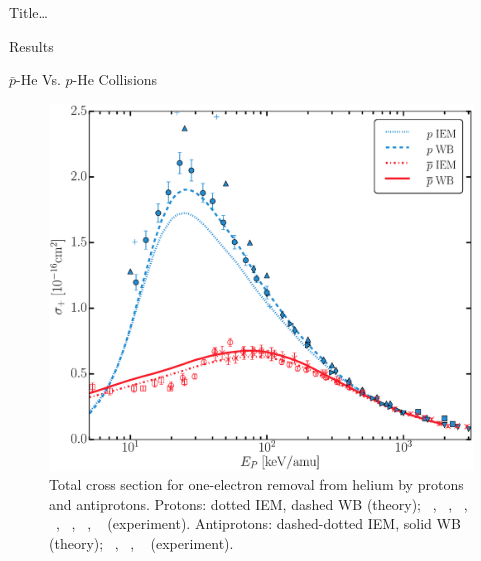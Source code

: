\documentclass[letterpaper, 11 pt]{report}
\begin{document}
\begin{chapter}{ Title\dots \label{chap:p-he2p-he}}
\begin{section}{Results \label{sec:phe2p-res}}
\begin{subsection}{ \texorpdfstring{$\bar{p}$}{pbar}-He Vs. \texorpdfstring{$p$}{p}-He Collisions
                         \label{sec:pbarhe-res}}
         \begin{figure}[ht]
            \begin{minipage}{.49\linewidth}
               
               \centering
               \includegraphics[width = \linewidth]{./images/pbarhe/pbarhe-+.eps}
               \caption[Total cross section for one-electron removal from helium by protons and
                        antiprotons.]
                       {Total cross section for one-electron removal from helium by protons and
                        antiprotons. Protons: dotted IEM, dashed WB (theory);
                        {\color{blue}{$\blacktriangle$}}~\cite{DTR84}, {\color{blue}{$+$}}~\cite{Sol62},
                        {\color{blue}{$\bullet$}}~\cite{SG89},
                        {\color{blue}{$\blacklozenge$}}~\cite{SG85},
                        {\color{blue}{$\blacktriangleright$}}~\cite{PM70},
                        {\color{blue}{$\blacktriangledown$}}~\cite{Wex64},
                        {\color{blue}{$\blacksquare$}}~\cite{KAH84} (experiment).
                        Antiprotons: dashed-dotted IEM, solid WB (theory);
                        {\color{red}{$\Box$}}~\cite{KKT08}, {\color{red}{$\circ$}}~\cite{HKM94},
                        {\color{red}{$\times$}}~\cite{AHK90} (experiment). \label{fig:he+}}
            \end{minipage} \hspace{0.04\linewidth} %
            \begin{minipage}{.49\linewidth}


\end{minipage}
\end{figure}
\end{subsection}
\end{section}
\end{chapter}
\end{document}

